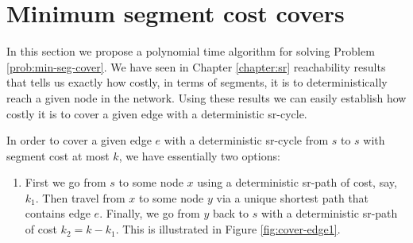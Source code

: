 \section{Minimum segment cost covers}

In this section we propose a polynomial time algorithm for solving Problem \ref{prob:min-seg-cover}.
We have seen in Chapter \ref{chapter:sr} reachability results that tells us exactly how costly,
in terms of segments, it is to deterministically reach a given node in the network. Using these results
we can easily establish how costly it is to cover a given edge with a deterministic sr-cycle.

In order to cover a given edge $e$ with a deterministic sr-cycle from $s$ to $s$ with segment cost at most
$k$, we have essentially two options:

\begin{enumerate}
 \item First we go from $s$ to some node $x$ using a deterministic sr-path of cost, say, $k_1$. Then travel
 from $x$ to some node $y$ via a unique shortest path that contains edge $e$. Finally, we go from $y$ back to $s$
 with a deterministic sr-path of cost $k_2 = k - k_1$. This is illustrated in Figure \ref{fig:cover-edge1}.
 
\begin{figure}
\begin{center}
\end{center}
\end{figure}
\end{enumerate}
